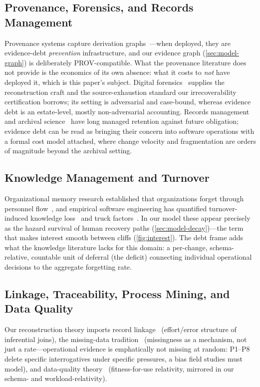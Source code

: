 \subsection{Provenance, Forensics, and Records Management}
Provenance systems capture derivation graphs~\cite{provdm,muniswamy2006,
pasquier2017}---when deployed, they are evidence-debt \emph{prevention}
infrastructure, and our evidence graph (\cref{sec:model-graph}) is deliberately
PROV-compatible. What the provenance literature does not provide is the economics
of its own absence: what it costs to \emph{not} have deployed it, which is this
paper's subject. Digital forensics~\cite{casey2011,nist80086} supplies the
reconstruction craft and the source-exhaustion standard our irrecoverability
certification borrows; its setting is adversarial and case-bound, whereas evidence
debt is an estate-level, mostly non-adversarial accounting. Records management and
archival science~\cite{iso15489,oais,rothenberg1995} have long managed retention
against future obligation; evidence debt can be read as bringing their concern into
software operations with a formal cost model attached, where change velocity and
fragmentation are orders of magnitude beyond the archival setting.

\subsection{Knowledge Management and Turnover}
Organizational memory research established that organizations forget through
personnel flow~\cite{walsh1991,nonaka1994}, and empirical software engineering has
quantified turnover-induced knowledge loss~\cite{rigby2016} and truck
factors~\cite{avelino2016}. In our model these appear precisely as the hazard
survival of human recovery paths (\cref{sec:model-decay})---the term that makes
interest smooth between cliffs (\cref{fig:interest}). The debt frame adds what the
knowledge literature lacks for this domain: a per-change, schema-relative,
countable unit of deferral (the deficit) connecting individual operational
decisions to the aggregate forgetting rate.

\subsection{Linkage, Traceability, Process Mining, and Data Quality}
\label{sec:rel-linkage}
Our reconstruction theory imports record linkage~\cite{fellegi1969,christen2012}
(effort/error structure of inferential joins), the missing-data
tradition~\cite{rubin1976,little2002} (missingness as a mechanism, not just a
rate---operational evidence is emphatically not missing at random: P1--P8 delete
specific interrogatives under specific pressures, a bias field studies must model),
and data-quality theory~\cite{wang1996} (fitness-for-use relativity, mirrored in
our schema- and workload-relativity).

